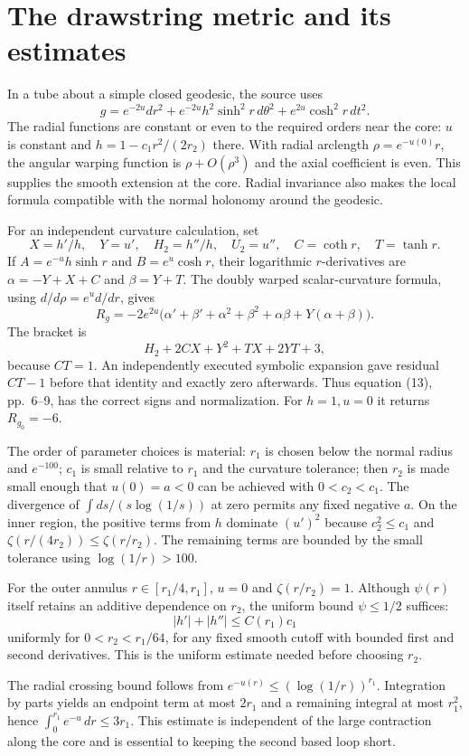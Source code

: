 \documentclass[10pt]{article}
\begin{document}
\section*{The drawstring metric and its estimates}
In a tube about a simple closed geodesic, the source uses \[g=e^{-2u}dr^2+e^{-2u}h^2\sinh^2r\,d\theta^2
                    +e^{2u}\cosh^2r\,dt^2.\] The radial functions are constant or even to the required orders near the core: \(u\) is constant and \(h=1-c_1r^2/(2r_2)\) there. With radial arclength \(\rho=e^{-u(0)}r\), the angular warping function is \(\rho+O(\rho^3)\) and the axial coefficient is even. This supplies the smooth extension at the core. Radial invariance also makes the local formula compatible with the normal holonomy around the geodesic.\par
For an independent curvature calculation, set \[X=h'/h,\quad Y=u',\quad H_2=h''/h,\quad U_2=u'',\quad
 C=\coth r,\quad T=\tanh r.\] If \(A=e^{-u}h\sinh r\) and \(B=e^u\cosh r\), their logarithmic \(r\)-derivatives are \(\alpha=-Y+X+C\) and \(\beta=Y+T\). The doubly warped scalar-curvature formula, using \(d/d\rho=e^u d/dr\), gives \[R_g=-2e^{2u}
  \bigl(\alpha'+\beta'+\alpha^2+\beta^2+\alpha\beta
                                      +Y(\alpha+\beta)\bigr).\] The bracket is \[H_2+2CX+Y^2+TX+2YT+3,\] because \(CT=1\). An independently executed symbolic expansion gave residual \(CT-1\) before that identity and exactly zero afterwards. Thus equation (13), pp. 6–9, has the correct signs and normalization. For \(h=1,u=0\) it returns \(R_{g_0}=-6\).\par
The order of parameter choices is material: \(r_1\) is chosen below the normal radius and \(e^{-100}\); \(c_1\) is small relative to \(r_1\) and the curvature tolerance; then \(r_2\) is made small enough that \(u(0)=a<0\) can be achieved with \(0<c_2<c_1\). The divergence of \(\int ds/(s\log(1/s))\) at zero permits any fixed negative \(a\). On the inner region, the positive terms from \(h\) dominate \((u')^2\) because \(c_2^2\leq c_1\) and \(\zeta(r/(4r_2))\leq\zeta(r/r_2)\). The remaining terms are bounded by the small tolerance using \(\log(1/r)>100\).\par
For the outer annulus \(r\in[r_1/4,r_1]\), \(u=0\) and \(\zeta(r/r_2)=1\). Although \(\psi(r)\) itself retains an additive dependence on \(r_2\), the uniform bound \(\psi\leq1/2\) suffices: \[|h'|+|h''|\leq C(r_1)c_1\] uniformly for \(0<r_2<r_1/64\), for any fixed smooth cutoff with bounded first and second derivatives. This is the uniform estimate needed before choosing \(r_2\).\par
The radial crossing bound follows from \(e^{-u(r)}\leq(\log(1/r))^{r_1}\). Integration by parts yields an endpoint term at most \(2r_1\) and a remaining integral at most \(r_1^2\), hence \(\int_0^{r_1}e^{-u}\,dr\leq3r_1\). This estimate is independent of the large contraction along the core and is essential to keeping the second based loop short.\par
\end{document}
